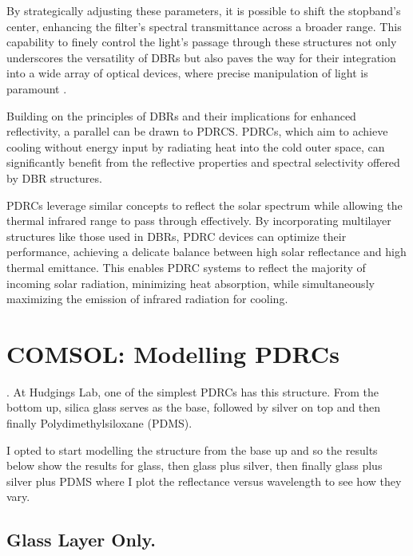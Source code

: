 By strategically adjusting these parameters, it is possible to shift the stopband's center, enhancing the filter's spectral transmittance across a broader range. This capability to finely control the light's passage through these structures not only underscores the versatility of DBRs but also paves the way for their integration into a wide array of optical devices, where precise manipulation of light is paramount \cite{pedrotti_introduction_2007}.

Building on the principles of DBRs and their implications for enhanced reflectivity, a parallel can be drawn to PDRCS. PDRCs, which aim to achieve cooling without energy input by radiating heat into the cold outer space, can significantly benefit from the reflective properties and spectral selectivity offered by DBR structures.

PDRCs leverage similar concepts to reflect the solar spectrum while allowing the thermal infrared range to pass through effectively. By incorporating multilayer structures like those used in DBRs, PDRC devices can optimize their performance, achieving a delicate balance between high solar reflectance and high thermal emittance. This enables PDRC systems to reflect the majority of incoming solar radiation, minimizing heat absorption, while simultaneously maximizing the emission of infrared radiation for cooling.

\section{COMSOL: Modelling PDRCs}.
At Hudgings Lab, one of the simplest PDRCs has this structure. From the bottom up, silica glass serves as the base, followed by silver on top and then finally Polydimethylsiloxane (PDMS).


I opted to start modelling the structure from the base up and so the results below show the results for glass, then glass plus silver, then finally glass plus silver plus PDMS where I plot the reflectance versus wavelength to see how they vary.

\subsection{Glass Layer Only.}

